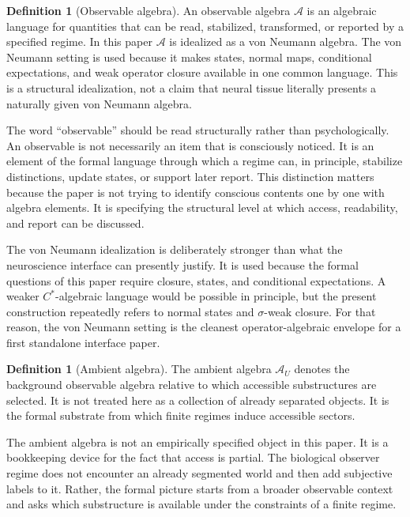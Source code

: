 \documentclass[12pt]{article}
\theoremstyle{definition}
\newtheorem{definition}[proposition]{Definition}
\theoremstyle{remark}
\newcommand{\AU}{\mathcal A_U}
\begin{document}
\begin{definition}[Observable algebra]
An observable algebra \(\mathcal A\) is an algebraic language for
quantities that can be read, stabilized, transformed, or reported by a
specified regime. In this paper \(\mathcal A\) is idealized as a von
Neumann algebra. The von Neumann setting is used because it makes states,
normal maps, conditional expectations, and weak operator closure
available in one common language. This is a structural idealization, not
a claim that neural tissue literally presents a naturally given von
Neumann algebra.
\end{definition}

The word ``observable'' should be read structurally rather than
psychologically. An observable is not necessarily an item that is
consciously noticed. It is an element of the formal language through
which a regime can, in principle, stabilize distinctions, update states,
or support later report. This distinction matters because the paper is
not trying to identify conscious contents one by one with algebra
elements. It is specifying the structural level at which access,
readability, and report can be discussed.

The von Neumann idealization is deliberately stronger than what the
neuroscience interface can presently justify. It is used because the
formal questions of this paper require closure, states, and conditional
expectations. A weaker \(C^*\)-algebraic language would be possible in
principle, but the present construction repeatedly refers to normal
states and \(\sigma\)-weak closure. For that reason, the von Neumann
setting is the cleanest operator-algebraic envelope for a first
standalone interface paper.

\begin{definition}[Ambient algebra]
The ambient algebra \(\AU\) denotes the background observable algebra
relative to which accessible substructures are selected. It is not
treated here as a collection of already separated objects. It is the
formal substrate from which finite regimes induce accessible sectors.
\end{definition}

The ambient algebra is not an empirically specified object in this
paper. It is a bookkeeping device for the fact that access is partial.
The biological observer regime does not encounter an already segmented
world and then add subjective labels to it. Rather, the formal picture
starts from a broader observable context and asks which substructure is
available under the constraints of a finite regime.
\end{document}
